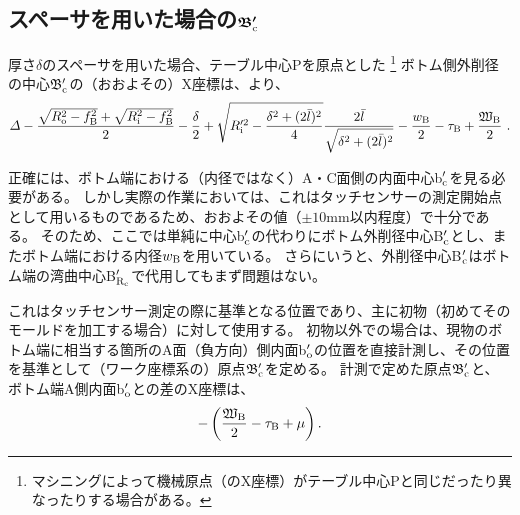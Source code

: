 \subsection[スペーサを用いた場合の$\mathfrak B_\text c'$]
           {スペーサを用いた場合の$\boldsymbol{\mathfrak B_\text c'}$}
厚さ$\delta$のスペーサを用いた場合、テーブル中心Pを原点とした
\footnote{マシニングによって機械原点（のX座標）がテーブル中心Pと同じだったり異なったりする場合がある。}\relax
ボトム側外削径の中心$\mathfrak B_\text c'$の（おおよその）X座標は、より、
\begin{align*}
  \varDelta-\frac{\sqrt{R_\text o^2-f_\text B^2}+\sqrt{R_\text i^2-f_\text B^2}}2-\frac\delta2+\sqrt{R_\text i'^2-\frac{\delta^2+(2\bar l)^2}4}\frac{2\bar l}{\sqrt{\delta^2+(2\bar l)^2}}
  -\frac{w_\text B}2-\tau_\text B+\frac{\mathfrak W_\text B}2\ .
\end{align*}
\begin{hosokubox}
正確には、ボトム端における（内径ではなく）A・C面側の内面中心b$_\text c'$を見る必要がある。
しかし実際の作業においては、これはタッチセンサーの測定開始点として用いるものであるため、おおよその値（$\pm10$mm以内程度）で十分である。
そのため、ここでは単純に中心b$_\text c'$の代わりにボトム外削径中心B$_\text c'$とし、またボトム端における内径$w_\text B$を用いている。
さらにいうと、外削径中心B$_\text c'$はボトム端の湾曲中心B$_{\text R_\text c}'$で代用してもまず問題はない。
\end{hosokubox}\relax
これはタッチセンサー測定の際に基準となる位置であり、主に初物（初めてそのモールドを加工する場合）に対して使用する。
初物以外での場合は、現物のボトム端に相当する箇所のA面（負方向）側内面b$_\text o'$の位置を直接計測し、その位置を基準として（ワーク座標系の）原点$\mathfrak B_\text c'$を定める。
計測で定めた原点$\mathfrak B_\text c'$と、ボトム端A側内面b$_\text o'$との差のX座標は、
\begin{align*}
  -\left(\frac{\mathfrak W_\text B}2-\tau_\text B+\mu\right).
\end{align*}


